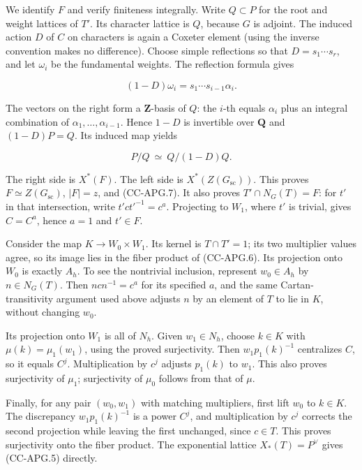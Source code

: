 We identify \(F\) and verify finiteness integrally. Write \(Q\subset P\)
for the root and weight lattices of \(T'\). Its character lattice is
\(Q\), because \(G\) is adjoint. The induced action \(D\) of \(C\) on
characters is again a Coxeter element (using the inverse convention
makes no difference). Choose simple reflections so that
\(D=s_1\cdots s_r\), and let \(\omega_i\) be the fundamental weights.
The reflection formula gives

\[
 (1-D)\omega_i=s_1\cdots s_{i-1}\alpha_i.
 \tag{CC-APG.13}
\]

The vectors on the right form a \(\mathbf Z\)-basis of \(Q\): the
\(i\)-th equals \(\alpha_i\) plus an integral combination of
\(\alpha_1,\ldots,\alpha_{i-1}\). Hence \(1-D\) is invertible over
\(\mathbf Q\) and \((1-D)P=Q\). Its induced map yields

\[
 P/Q \ \simeq\ Q/(1-D)Q.
 \tag{CC-APG.14}
\]

The right side is \(X^*(F)\). The left side is
\(X^*(Z(G_{\mathrm{sc}}))\). This proves \(F\simeq Z(G_{\mathrm{sc}})\),
\(|F|=z\), and (CC-APG.7). It also proves \(T'\cap N_G(T)=F\): for
\(t'\) in that intersection, write \(t'ct'^{-1}=c^a\). Projecting to
\(W_1\), where \(t'\) is trivial, gives \(C=C^a\), hence \(a=1\) and
\(t'\in F\).

Consider the map \(K\to W_0\times W_1\). Its kernel is \(T\cap T'=1\);
its two multiplier values agree, so its image lies in the fiber product
of (CC-APG.6). Its projection onto \(W_0\) is exactly \(A_h\). To see
the nontrivial inclusion, represent \(w_0\in A_h\) by \(n\in N_G(T)\).
Then \(ncn^{-1}=c^a\) for its specified \(a\), and the same
Cartan-transitivity argument used above adjusts \(n\) by an element of
\(T\) to lie in \(K\), without changing \(w_0\).

Its projection onto \(W_1\) is all of \(N_h\). Given \(w_1\in N_h\),
choose \(k\in K\) with \(\mu(k)=\mu_1(w_1)\), using the proved
surjectivity. Then \(w_1p_1(k)^{-1}\) centralizes \(C\), so it equals
\(C^j\). Multiplication by \(c^j\) adjusts \(p_1(k)\) to \(w_1\). This
also proves surjectivity of \(\mu_1\); surjectivity of \(\mu_0\) follows
from that of \(\mu\).

Finally, for any pair \((w_0,w_1)\) with matching multipliers, first
lift \(w_0\) to \(k\in K\). The discrepancy \(w_1p_1(k)^{-1}\) is a
power \(C^j\), and multiplication by \(c^j\) corrects the second
projection while leaving the first unchanged, since \(c\in T\). This
proves surjectivity onto the fiber product. The exponential lattice
\(X_*(T)=P^\vee\) gives (CC-APG.5) directly.

